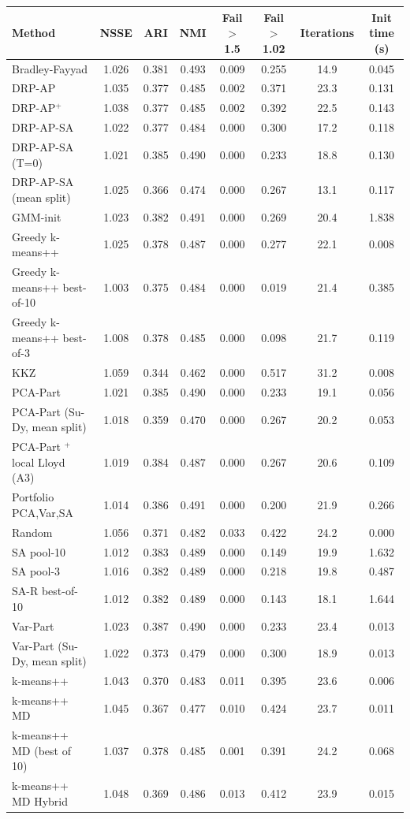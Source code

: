 \begin{tabular}{lccccccc}
\toprule
Method & NSSE & ARI & NMI & Fail$>$1.5 & Fail$>$1.02 & Iterations & Init time (s) \\
\midrule
Bradley-Fayyad & 1.026 & 0.381 & 0.493 & 0.009 & 0.255 & 14.9 & 0.045 \\
DRP-AP & 1.035 & 0.377 & 0.485 & 0.002 & 0.371 & 23.3 & 0.131 \\
DRP-AP$^{+}$ & 1.038 & 0.377 & 0.485 & 0.002 & 0.392 & 22.5 & 0.143 \\
DRP-AP-SA & 1.022 & 0.377 & 0.484 & 0.000 & 0.300 & 17.2 & 0.118 \\
DRP-AP-SA (T=0) & 1.021 & 0.385 & 0.490 & 0.000 & 0.233 & 18.8 & 0.130 \\
DRP-AP-SA (mean split) & 1.025 & 0.366 & 0.474 & 0.000 & 0.267 & 13.1 & 0.117 \\
GMM-init & 1.023 & 0.382 & 0.491 & 0.000 & 0.269 & 20.4 & 1.838 \\
Greedy k-means++ & 1.025 & 0.378 & 0.487 & 0.000 & 0.277 & 22.1 & 0.008 \\
Greedy k-means++ best-of-10 & 1.003 & 0.375 & 0.484 & 0.000 & 0.019 & 21.4 & 0.385 \\
Greedy k-means++ best-of-3 & 1.008 & 0.378 & 0.485 & 0.000 & 0.098 & 21.7 & 0.119 \\
KKZ & 1.059 & 0.344 & 0.462 & 0.000 & 0.517 & 31.2 & 0.008 \\
PCA-Part & 1.021 & 0.385 & 0.490 & 0.000 & 0.233 & 19.1 & 0.056 \\
PCA-Part (Su-Dy, mean split) & 1.018 & 0.359 & 0.470 & 0.000 & 0.267 & 20.2 & 0.053 \\
PCA-Part $^{+}$ local Lloyd (A3) & 1.019 & 0.384 & 0.487 & 0.000 & 0.267 & 20.6 & 0.109 \\
Portfolio {PCA,Var,SA} & 1.014 & 0.386 & 0.491 & 0.000 & 0.200 & 21.9 & 0.266 \\
Random & 1.056 & 0.371 & 0.482 & 0.033 & 0.422 & 24.2 & 0.000 \\
SA pool-10 & 1.012 & 0.383 & 0.489 & 0.000 & 0.149 & 19.9 & 1.632 \\
SA pool-3 & 1.016 & 0.382 & 0.489 & 0.000 & 0.218 & 19.8 & 0.487 \\
SA-R best-of-10 & 1.012 & 0.382 & 0.489 & 0.000 & 0.143 & 18.1 & 1.644 \\
Var-Part & 1.023 & 0.387 & 0.490 & 0.000 & 0.233 & 23.4 & 0.013 \\
Var-Part (Su-Dy, mean split) & 1.022 & 0.373 & 0.479 & 0.000 & 0.300 & 18.9 & 0.013 \\
k-means++ & 1.043 & 0.370 & 0.483 & 0.011 & 0.395 & 23.6 & 0.006 \\
k-means++ MD & 1.045 & 0.367 & 0.477 & 0.010 & 0.424 & 23.7 & 0.011 \\
k-means++ MD (best of 10) & 1.037 & 0.378 & 0.485 & 0.001 & 0.391 & 24.2 & 0.068 \\
k-means++ MD Hybrid & 1.048 & 0.369 & 0.486 & 0.013 & 0.412 & 23.9 & 0.015 \\
\bottomrule
\end{tabular}